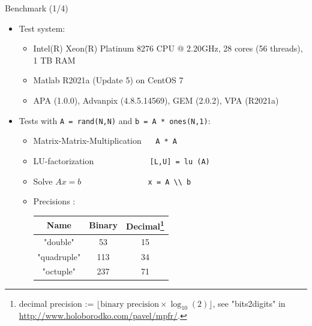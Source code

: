 \begin{frame}{Benchmark (1/4)}

\begin{itemize}\itemsep1em
\item
Test system:
\begin{itemize}
\item
Intel(R) Xeon(R) Platinum 8276 CPU @ 2.20GHz,
28 cores (56 threads),
1 TB RAM

\item
Matlab R2021a (Update 5) on CentOS 7 \\[0.5em]

\item
{\color{blue}
APA (1.0.0), Advanpix (4.8.5.14569), GEM (2.0.2), VPA (R2021a)}
\end{itemize}

\item
Tests with \lstinline|A = rand(N,N)| and \lstinline|b = A * ones(N,1)|:

\begin{itemize}
\item
Matrix-Matrix-Multiplication
$\quad$
\lstinline|A * A|

\item
LU-factorization
$\qquad\qquad\qquad$
\lstinline|[L,U] = lu (A)|

\item
Solve $Ax = b$
$\qquad\qquad\qquad\quad\;$
\lstinline|x = A \\ b|\\[0.5em]

\item
Precisions \cite[Chapter 3.1]{Muller2018}:

\begin{tabular}{|c|c|c|}
\hline
Name & Binary & Decimal\footnote{\scriptsize decimal precision
:= $\lfloor \text{binary precision} \times \log_{10}(2) \rfloor$,
see "bits2digits" in \url{http://www.holoborodko.com/pavel/mpfr/}.} \\
\hline\hline
"double"    &  53 & 15 \\
"quadruple" & 113 & 34 \\
"octuple"   & 237 & 71 \\
\hline
\end{tabular}

\end{itemize}

\end{itemize}

\end{frame}


